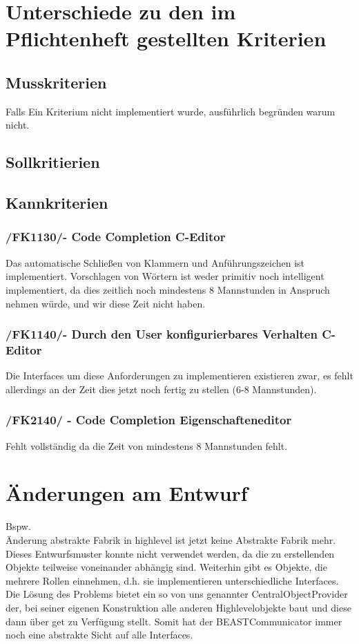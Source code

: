 \documentclass[a4paper]{scrreprt}
\begin{document}
\chapter{Unterschiede zu den im Pflichtenheft gestellten Kriterien}

\section{Musskriterien}
Falls Ein Kriterium nicht implementiert wurde, ausführlich begründen warum nicht.

\section{Sollkritierien}
\section{Kannkriterien}

\subsection{/FK1130/- Code Completion C-Editor}
Das automatische Schließen von Klammern und Anführungszeichen ist implementiert. Vorschlagen von Wörtern ist weder primitiv noch intelligent implementiert, da dies zeitlich noch mindestens 8 Mannstunden in Anspruch nehmen würde, und wir diese Zeit nicht haben.

\subsection{/FK1140/- Durch den User konfigurierbares Verhalten C-Editor}
Die Interfaces um diese Anforderungen zu implementieren existieren zwar, es fehlt allerdings an der Zeit dies jetzt noch fertig zu stellen (6-8 Mannstunden).

\subsection{/FK2140/ - Code Completion Eigenschafteneditor}
Fehlt vollständig da die Zeit von mindestens 8 Mannstunden fehlt.

\chapter{Änderungen am Entwurf}
Bspw. \\
Änderung abstrakte Fabrik in highlevel ist jetzt keine Abstrakte Fabrik mehr.\\ Dieses Entwurfsmuster konnte nicht verwendet werden, da die zu erstellenden Objekte teilweise voneinander abhängig sind. Weiterhin gibt es Objekte, die mehrere Rollen einnehmen, d.h. sie implementieren unterschiedliche Interfaces. \\
Die Lösung des Problems bietet ein so von uns genannter CentralObjectProvider der, bei seiner eigenen Konstruktion alle anderen Highlevelobjekte baut und diese dann über get zu Verfügung stellt.
Somit hat der BEASTCommunicator immer noch eine abstrakte Sicht auf alle Interfaces.
\end{document}
